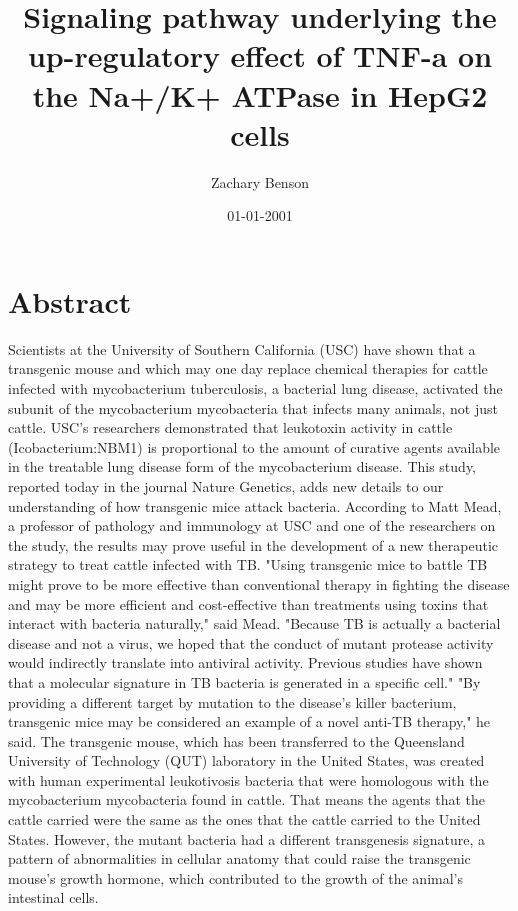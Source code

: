\documentclass{article}%
\title{Signaling pathway underlying the up{-}regulatory effect of TNF{-}a on the Na+/K+ ATPase in HepG2 cells}%
\author{Zachary Benson}%
\affil{Department of Pathophysiology, School of Pharmacy and Biochemistry, University of Buenos Aires, INFIBIOC{-}CONICET, Argentina}%
\date{01{-}01{-}2001}%
\begin{document}
%
\normalsize%
\maketitle%
\section{Abstract}%
\label{sec:Abstract}%
Scientists at the University of Southern California (USC) have shown that a transgenic mouse and which may one day replace chemical therapies for cattle infected with mycobacterium tuberculosis, a bacterial lung disease, activated the subunit of the mycobacterium mycobacteria that infects many animals, not just cattle.\newline%
USC's researchers demonstrated that leukotoxin activity in cattle (Icobacterium:NBM1) is proportional to the amount of curative agents available in the treatable lung disease form of the mycobacterium disease. This study, reported today in the journal Nature Genetics, adds new details to our understanding of how transgenic mice attack bacteria.\newline%
According to Matt Mead, a professor of pathology and immunology at USC and one of the researchers on the study, the results may prove useful in the development of a new therapeutic strategy to treat cattle infected with TB.\newline%
"Using transgenic mice to battle TB might prove to be more effective than conventional therapy in fighting the disease and may be more efficient and cost{-}effective than treatments using toxins that interact with bacteria naturally," said Mead. "Because TB is actually a bacterial disease and not a virus, we hoped that the conduct of mutant protease activity would indirectly translate into antiviral activity. Previous studies have shown that a molecular signature in TB bacteria is generated in a specific cell."\newline%
"By providing a different target by mutation to the disease's killer bacterium, transgenic mice may be considered an example of a novel anti{-}TB therapy," he said.\newline%
The transgenic mouse, which has been transferred to the Queensland University of Technology (QUT) laboratory in the United States, was created with human experimental leukotivosis bacteria that were homologous with the mycobacterium mycobacteria found in cattle. That means the agents that the cattle carried were the same as the ones that the cattle carried to the United States. However, the mutant bacteria had a different transgenesis signature, a pattern of abnormalities in cellular anatomy that could raise the transgenic mouse's growth hormone, which contributed to the growth of the animal's intestinal cells.\newline%
\end{document}
